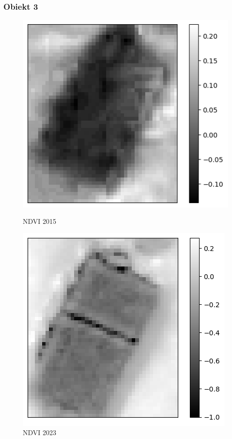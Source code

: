 \documentclass[a4paper,12pt]{article}  %
\begin{document}
\subsubsection{Obiekt 3}

\begin{figure}[H]
    \centering
    \begin{minipage}{0.45\textwidth}
        \centering
        \includegraphics[width=\linewidth]{spektralne/ndvi_budynek3_2015.png}
        \caption*{NDVI 2015}
    \end{minipage}
    \begin{minipage}{0.45\textwidth}
        \centering
        \includegraphics[width=\linewidth]{spektralne/ndvi_budynek3_2023.png}
        \caption*{NDVI 2023}
    \end{minipage}
\end{figure}
\end{document}
